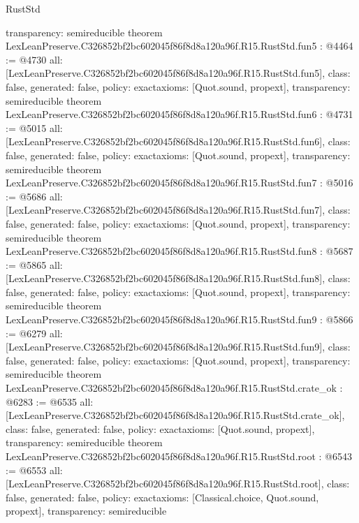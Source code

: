 \begin{lexlean}{RustStd}
\begin{coremodule}
{  transparency: semireducible
}
theorem LexLeanPreserve.C326852bf2bc602045f86f8d8a120a96f.R15.RustStd.fun5 : @4464 := @4730 {
  all: [LexLeanPreserve.C326852bf2bc602045f86f8d8a120a96f.R15.RustStd.fun5],
  class: false,
  generated: false,
  policy: exact{axioms: [Quot.sound, propext]},
  transparency: semireducible
}
theorem LexLeanPreserve.C326852bf2bc602045f86f8d8a120a96f.R15.RustStd.fun6 : @4731 := @5015 {
  all: [LexLeanPreserve.C326852bf2bc602045f86f8d8a120a96f.R15.RustStd.fun6],
  class: false,
  generated: false,
  policy: exact{axioms: [Quot.sound, propext]},
  transparency: semireducible
}
theorem LexLeanPreserve.C326852bf2bc602045f86f8d8a120a96f.R15.RustStd.fun7 : @5016 := @5686 {
  all: [LexLeanPreserve.C326852bf2bc602045f86f8d8a120a96f.R15.RustStd.fun7],
  class: false,
  generated: false,
  policy: exact{axioms: [Quot.sound, propext]},
  transparency: semireducible
}
theorem LexLeanPreserve.C326852bf2bc602045f86f8d8a120a96f.R15.RustStd.fun8 : @5687 := @5865 {
  all: [LexLeanPreserve.C326852bf2bc602045f86f8d8a120a96f.R15.RustStd.fun8],
  class: false,
  generated: false,
  policy: exact{axioms: [Quot.sound, propext]},
  transparency: semireducible
}
theorem LexLeanPreserve.C326852bf2bc602045f86f8d8a120a96f.R15.RustStd.fun9 : @5866 := @6279 {
  all: [LexLeanPreserve.C326852bf2bc602045f86f8d8a120a96f.R15.RustStd.fun9],
  class: false,
  generated: false,
  policy: exact{axioms: [Quot.sound, propext]},
  transparency: semireducible
}
theorem LexLeanPreserve.C326852bf2bc602045f86f8d8a120a96f.R15.RustStd.crate_ok : @6283 := @6535 {
  all: [LexLeanPreserve.C326852bf2bc602045f86f8d8a120a96f.R15.RustStd.crate_ok],
  class: false,
  generated: false,
  policy: exact{axioms: [Quot.sound, propext]},
  transparency: semireducible
}
theorem LexLeanPreserve.C326852bf2bc602045f86f8d8a120a96f.R15.RustStd.root : @6543 := @6553 {
  all: [LexLeanPreserve.C326852bf2bc602045f86f8d8a120a96f.R15.RustStd.root],
  class: false,
  generated: false,
  policy: exact{axioms: [Classical.choice, Quot.sound, propext]},
  transparency: semireducible
}


\end{coremodule}
\end{lexlean}
